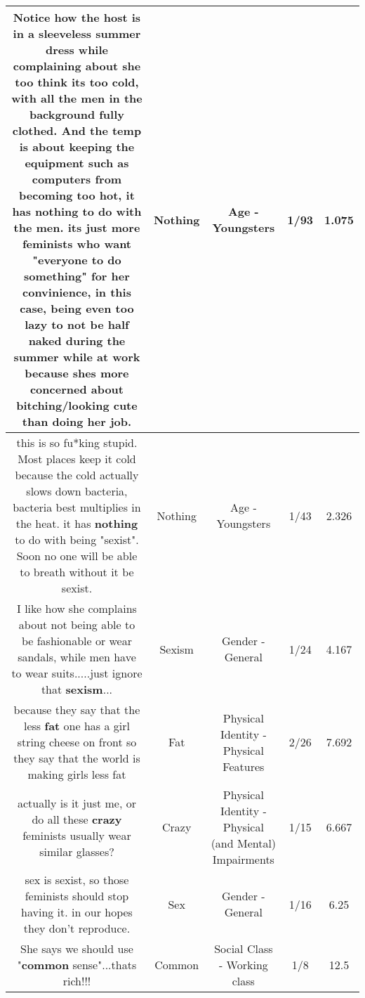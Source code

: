 \documentclass[11pt]{article}
\newlength\mylength
\begin{document}
\begin{center}
\begin{longtable}{|C{.65\mylength}|C{.30\mylength}|C{.12\mylength}|C{.12\mylength}|C{.12\mylength}|}
  \small Notice how the host is in a sleeveless summer dress while complaining about she too think its too cold, with all the men in the background fully clothed. And the temp is about keeping the equipment such as computers from becoming too hot, it has \textbf{nothing} to do with the men. its just more feminists who want "everyone to do something" for her convinience, in this case, being even too lazy to not be half naked during the summer while at work because shes more concerned about bitching/looking cute than doing her job.\normalsize   & Nothing & Age - Youngsters & 1/93 & 1.075 \\  \hline
  \small this is so fu*king stupid. Most places keep it cold because the cold actually slows down bacteria, bacteria best multiplies in the heat. it has \textbf{nothing} to do with being "sexist". Soon no one will be able to breath without it be sexist.\normalsize   & Nothing & Age - Youngsters & 1/43 & 2.326 \\  \hline
  \small I like how she complains about not being able to be fashionable or wear sandals, while men have to wear suits.....just ignore that \textbf{sexism}...\normalsize   & Sexism & Gender - General & 1/24 & 4.167 \\  \hline
  \small because they say that the less \textbf{fat} one has a girl string cheese on front so they say that the world is making girls less fat\normalsize   & Fat & Physical Identity - Physical Features & 2/26 & 7.692 \\  \hline
  \small actually is it just me, or do all these \textbf{crazy} feminists usually wear similar glasses?\normalsize   & Crazy & Physical Identity - Physical (and Mental) Impairments & 1/15 & 6.667 \\  \hline
  \small sex is sexist, so those feminists should stop having it. in our hopes they don't reproduce.\normalsize   & Sex & Gender - General & 1/16 & 6.25 \\  \hline
  \small She says we should use "\textbf{common} sense"...thats rich!!!\normalsize   & Common & Social Class - Working class & 1/8 & 12.5 \\  \hline

\end{longtable}
\end{center}
\end{document}

